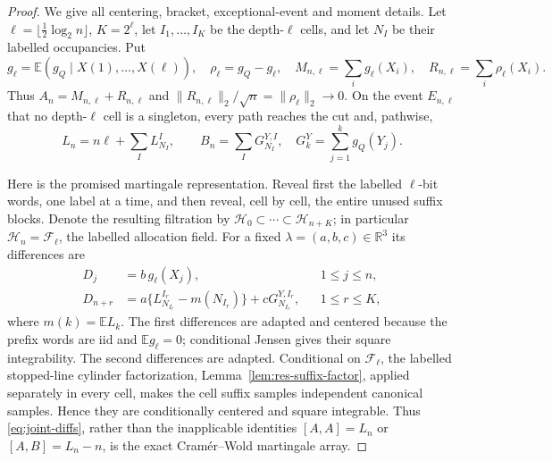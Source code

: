\documentclass[11pt]{article}
\numberwithin{equation}{section}
\newcommand{\1}{\mathbf 1}\newcommand{\F}{\mathcal F}\newcommand{\D}{\mathcal D}
\begin{document}
\begin{proof}
We give all centering, bracket, exceptional-event and moment details.  Let
$\ell=\lfloor\frac12\log _2n\rfloor$, $K=2^\ell$, let $I_1,\ldots,I_K$
be the depth-$\ell$ cells, and let $N_I$ be their labelled occupancies.  Put
\[
 g_\ell=\mathbb E(g_Q\mid X(1),\ldots,X(\ell)),\quad
 \rho_\ell=g_Q-g_\ell,\quad M_{n,\ell}=\sum_i g_\ell(X_i),\quad
 R_{n,\ell}=\sum_i\rho_\ell(X_i).
\]
Thus $A_n=M_{n,\ell}+R_{n,\ell}$ and
$\|R_{n,\ell}\|_2/\sqrt n=\|\rho_\ell\|_2\to0$.  On the event
$E_{n,\ell}$ that no depth-$\ell$ cell is a singleton, every path reaches
the cut and, pathwise,
\begin{equation}
 L_n=n\ell+\sum_I L_{N_I}^{I},\qquad
 B_n=\sum_I G_{N_I}^{Y,I},\quad G_k^Y=\sum_{j=1}^kg_Q(Y_j).
                                                        \label{eq:joint-cut}
\end{equation}

Here is the promised martingale representation.  Reveal first the labelled
$\ell$-bit words, one label at a time, and then reveal, cell by cell, the
entire unused suffix blocks.  Denote the resulting filtration by
$\mathcal H_0\subset\cdots\subset\mathcal H_{n+K}$; in particular
$\mathcal H_n=\mathcal F_\ell$, the labelled allocation field.  For a fixed
$\lambda=(a,b,c)\in\mathbb R^3$ its differences are
\begin{align*}
 D_j&=b\,g_\ell(X_j),&&1\le j\le n,\\
 D_{n+r}&=a\{L_{N_{I_r}}^{I_r}-m(N_{I_r})\}
              +cG_{N_{I_r}}^{Y,I_r},&&1\le r\le K,
                                                        \label{eq:joint-diffs}
\end{align*}
where $m(k)=\mathbb EL_k$.  The first differences are adapted and centered
because the prefix words are iid and $\mathbb Eg_\ell=0$; conditional
Jensen gives their square integrability.  The second differences are
adapted.  Conditional on $\mathcal F_\ell$, the labelled stopped-line cylinder
factorization, Lemma~\ref{lem:res-suffix-factor}, applied separately in every
cell, makes the cell suffix
samples independent canonical samples.  Hence they are conditionally
centered and square integrable.  Thus \eqref{eq:joint-diffs}, rather than the
inapplicable identities $[A,A]=L_n$ or $[A,B]=L_n-n$, is the exact
Cram\'er--Wold martingale array.


\end{proof}
\end{document}
